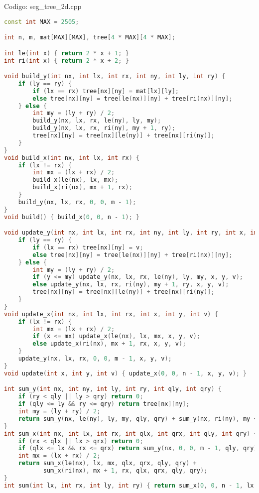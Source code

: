 \documentclass[10pt, a4paper, oneside]{book}
\begin{document}
Codigo: seg\_tree\_2d.cpp

\begin{lstlisting}[language=C++]
const int MAX = 2505;

int n, m, mat[MAX][MAX], tree[4 * MAX][4 * MAX];

int le(int x) { return 2 * x + 1; }
int ri(int x) { return 2 * x + 2; }

void build_y(int nx, int lx, int rx, int ny, int ly, int ry) {
    if (ly == ry) {
        if (lx == rx) tree[nx][ny] = mat[lx][ly];
        else tree[nx][ny] = tree[le(nx)][ny] + tree[ri(nx)][ny];
    } else {
        int my = (ly + ry) / 2;
        build_y(nx, lx, rx, le(ny), ly, my);
        build_y(nx, lx, rx, ri(ny), my + 1, ry);
        tree[nx][ny] = tree[nx][le(ny)] + tree[nx][ri(ny)];
    }
}
void build_x(int nx, int lx, int rx) {
    if (lx != rx) {
        int mx = (lx + rx) / 2;
        build_x(le(nx), lx, mx);
        build_x(ri(nx), mx + 1, rx);
    }
    build_y(nx, lx, rx, 0, 0, m - 1);
}
void build() { build_x(0, 0, n - 1); }

void update_y(int nx, int lx, int rx, int ny, int ly, int ry, int x, int y, int v) {
    if (ly == ry) {
        if (lx == rx) tree[nx][ny] = v;
        else tree[nx][ny] = tree[le(nx)][ny] + tree[ri(nx)][ny];
    } else {
        int my = (ly + ry) / 2;
        if (y <= my) update_y(nx, lx, rx, le(ny), ly, my, x, y, v);
        else update_y(nx, lx, rx, ri(ny), my + 1, ry, x, y, v);
        tree[nx][ny] = tree[nx][le(ny)] + tree[nx][ri(ny)];
    }
}
void update_x(int nx, int lx, int rx, int x, int y, int v) {
    if (lx != rx) {
        int mx = (lx + rx) / 2;
        if (x <= mx) update_x(le(nx), lx, mx, x, y, v);
        else update_x(ri(nx), mx + 1, rx, x, y, v);
    }
    update_y(nx, lx, rx, 0, 0, m - 1, x, y, v);
}
void update(int x, int y, int v) { update_x(0, 0, n - 1, x, y, v); }

int sum_y(int nx, int ny, int ly, int ry, int qly, int qry) {
    if (ry < qly || ly > qry) return 0;
    if (qly <= ly && ry <= qry) return tree[nx][ny];
    int my = (ly + ry) / 2;
    return sum_y(nx, le(ny), ly, my, qly, qry) + sum_y(nx, ri(ny), my + 1, ry, qly, qry);
}
int sum_x(int nx, int lx, int rx, int qlx, int qrx, int qly, int qry) {
    if (rx < qlx || lx > qrx) return 0;
    if (qlx <= lx && rx <= qrx) return sum_y(nx, 0, 0, m - 1, qly, qry);
    int mx = (lx + rx) / 2;
    return sum_x(le(nx), lx, mx, qlx, qrx, qly, qry) +
           sum_x(ri(nx), mx + 1, rx, qlx, qrx, qly, qry);
}
int sum(int lx, int rx, int ly, int ry) { return sum_x(0, 0, n - 1, lx, rx, ly, ry); }
\end{lstlisting}
\hfill
\end{document}
